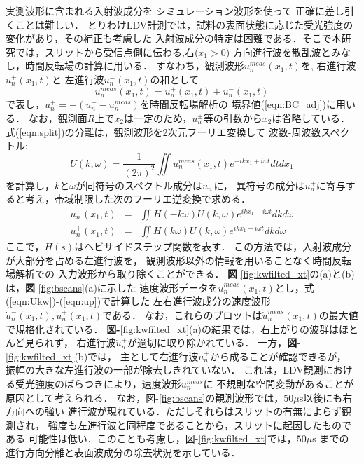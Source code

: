 実測波形に含まれる入射波成分を
%
シミュレーション波形を使って
%
正確に差し引くことは難しい．
とりわけLDV計測では，試料の表面状態に応じた受光強度の変化があり，その補正も考慮した
入射波成分の特定は困難である．そこで本研究では，スリットから受信点側に伝わる,右($x_1>0$)
方向進行波を散乱波とみなし，時間反転場の計算に用いる．
すなわち，観測波形$u_n^{meas}(x_1,t)$を,
右進行波$u_n^{+}(x_1,t)$と
左進行波$u_n^{-}(x_1,t)$の和として
\begin{equation}
	u_n^{meas}(x_1,t)=u_n^{+}(x_1,t)+u_n^{-}(x_1,t)
	\label{eqn:split}
\end{equation}
で表し，$u_n^+=-(u_n^{-}-u_n^{meas})$を時間反転場解析の
境界値(\ref{eqn:BC_adj})に用いる．
%
なお，観測面$R$上で$x_2$は一定のため，$u_n^{\pm}$等の引数から$x_2$は省略している．
%
式(\ref{eqn:split})の分離は，観測波形を2次元フーリエ変換して
波数-周波数スペクトル:
\begin{equation}
	U(k,\omega)= \frac{1}{(2\pi)^2} \iint u^{meas}_n(x_1,t)e^{-ikx_1+i\omega t}dtdx_1
	\label{eqn:Ukw}
\end{equation}
を計算し，$k$と$\omega$が同符号のスペクトル成分は$u_n^-$に，
異符号の成分は$u_n^+$に寄与すると考え，帯域制限した次のフーリエ逆変換で求める．
\begin{eqnarray}
	u_n^-(x_1,t) &=& \iint H(-k\omega)U(k,\omega)e^{ikx_1-i\omega t}dk d\omega
	\label{eqn:um} \\
	u_n^+(x_1,t) &=& \iint H(k\omega) U(k,\omega)e^{ikx_1-i\omega t}dk d\omega 
	\label{eqn:up}
\end{eqnarray}
ここで，$H(s)$はヘビサイドステップ関数を表す．
この方法では，入射波成分が大部分を占める左進行波を，
観測波形以外の情報を用いることなく時間反転場解析での
入力波形から取り除くことができる．
{\bf 図}-\ref{fig:kwfilted_xt}の(a)と(b)は，{\bf 図}-\ref{fig:bscans}(a)に示した
速度波形データを$\dot u_n^{meas}(x_1,t)$とし，式(\ref{eqn:Ukw})-(\ref{eqn:up})で計算した
左右進行波成分の速度波形$\dot{u}_n^-(x_1,t),\dot{u}_n^+(x_1,t)$である．
なお，これらのプロットは$\dot u_n^{meas}(x_1,t)$の最大値で規格化されている．
{\bf 図-}\ref{fig:kwfilted_xt}(a)の結果では，右上がりの波群はほとんど見られず，
右進行波$\dot u_n^+$が適切に取り除かれている．
一方，{\bf 図}-\ref{fig:kwfilted_xt}(b)では，
主として右進行波$\dot u_n^{+}$から成ることが確認できるが，
振幅の大きな左進行波の一部が除去しきれていない．
これは，LDV観測における受光強度のばらつきにより，速度波形$u_n^{meas}$に
不規則な空間変動があることが原因として考えられる．
%
なお，{\rm 図}-\ref{fig:bscans}の観測波形では，$50\mu$s以後にも右方向への強い
進行波が現れている．ただしそれらはスリットの有無によらず観測され，
強度も左進行波と同程度であることから，スリットに起因したものである
可能性は低い．このことも考慮し，{\rm 図}-\ref{fig:kwfilted_xt}では，$50\mu$s
までの進行方向分離と表面波成分の除去状況を示している．
%
